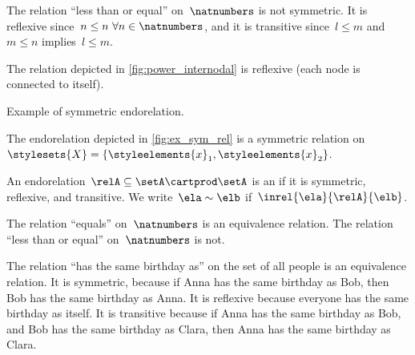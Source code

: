 \begin{example}
    The relation ``less than or equal'' on~$\natnumbers$ is not symmetric.
    It is reflexive since~$n\leq n \ \forall n\in \natnumbers$, and it is transitive since~$l\leq m$ and~$m\leq n$ implies~$l\leq m$.
\end{example}

\begin{example}
    The relation depicted in \cref{fig:power_internodal} is reflexive (each node is connected to itself).
\end{example}
\begin{marginfigure}
    \centering
    \caption{Example of symmetric endorelation.}
    \label{fig:ex_sym_rel}
\end{marginfigure}
\begin{example}
    The endorelation depicted in \cref{fig:ex_sym_rel} is a symmetric relation on~$\stylesets{X}=\{\styleelements{x}_1,\styleelements{x}_2\}$.
\end{example}


\begin{definition}
    \label{def:equivalence-relation}
    An endorelation~$\relA\subseteq \setA\cartprod \setA$ is an \emph{} if it is symmetric, reflexive, and transitive.
    We write~$\ela\sim \elb$ if~$\inrel{\ela}{\relA}{\elb}$.
\end{definition}

\begin{example}
    The relation ``equals'' on~$\natnumbers$ is an equivalence relation.
    The relation ``less than or equal'' on~$\natnumbers$ is not.
\end{example}

\begin{example}
    The relation ``has the same birthday as'' on the set of all people is an equivalence relation.
    It is symmetric, because if Anna has the same birthday as Bob, then Bob has the same birthday as Anna.
    It is reflexive because everyone has the same birthday as itself.
    It is transitive because if Anna has the same birthday as Bob, and Bob has the same birthday as Clara, then Anna has the same birthday as Clara.
\end{example}

